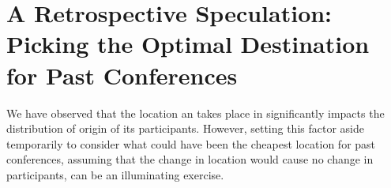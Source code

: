 







\section{A Retrospective Speculation: Picking the Optimal Destination for Past Conferences}
\label{sec:speculate}


We have observed that the location an \event takes place in significantly
impacts the distribution of origin of its participants. However, setting
this factor aside temporarily to consider what could have been the cheapest
location for past conferences, assuming that the change in location would
cause no change in participants, can be an illuminating exercise.

